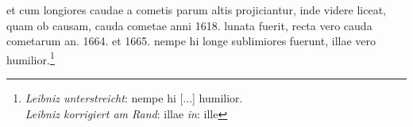\pend \pstart [p.~189] [...] et cum longiores caudae\protect{}  a cometis parum altis projiciantur, inde videre liceat,  quam ob causam, cauda cometae\protect{} anni 1618. lunata fuerit,  recta vero cauda cometarum\protect{} an. 1664. et 1665. nempe hi  longe sublimiores fuerunt, illae vero humilior.\footnote{\textit{Leibniz unterstreicht}: nempe hi [...] humilior.\\ \textit{Leibniz korrigiert am Rand}: illae \textit{in}: ille}